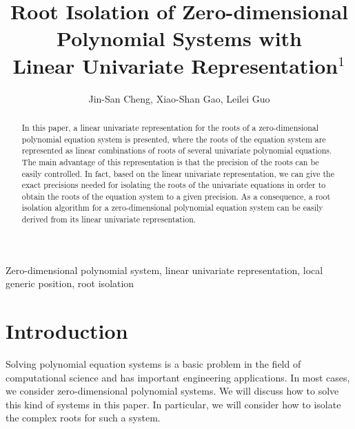 \documentclass[amsthm]{JSC_LaTex_2007_Mar_12/elsart}
\begin{document}
\begin{frontmatter}





\title{Root Isolation of Zero-dimensional\\ Polynomial Systems with \\Linear Univariate Representation$^1$}
\author{Jin-San Cheng, Xiao-Shan Gao, Leilei Guo}

\address{
KLMM, Institute of Systems Science, AMSS, Chinese Academy of Sciences\\
Email: xgao@mmrc.iss.ac.cn,jcheng@amss.ac.cn}



\begin{abstract}
In this paper, a linear univariate representation for the roots of a
zero-dimensional polynomial equation system is presented, where the
roots of the equation system are represented as linear combinations
of roots of several univariate polynomial equations. The main
advantage of this representation is that the precision of the roots
can be easily controlled. In fact, based on the linear univariate
representation, we can give the exact precisions needed for
isolating the roots of the univariate equations in order to obtain
the roots of the equation system to a given precision. As a
consequence, a root isolation algorithm for a zero-dimensional
polynomial equation system can be easily derived from its linear
univariate representation.
\end{abstract}
\begin{keyword}
Zero-dimensional polynomial system,
 linear univariate representation, local generic position, root isolation
\end{keyword}

\end{frontmatter}

\section{Introduction}
Solving polynomial equation systems is a basic problem in the field
of computational science and has important engineering applications.
In most cases, we consider zero-dimensional polynomial systems. We
will discuss how to solve this kind of systems in this paper. In
particular, we will consider how to isolate the complex roots for
such a system.
\end{document}
